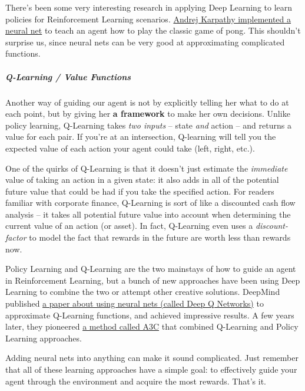 \documentclass[a4paper, 11pt]{article}
\begin{document}
There's been some very interesting research in applying Deep Learning to
learn policies for Reinforcement Learning scenarios.
\href{http://karpathy.github.io/2016/05/31/rl/}{Andrej Karpathy
implemented a neural net} to teach an agent how to play the classic game
of pong. This shouldn't surprise us, since neural nets can be very good
at approximating complicated functions.

\subparagraph{\emph{Q-Learning / Value Functions}}

Another way of guiding our agent is not by explicitly telling her what
to do at each point, but by giving her \textbf{a framework} to make her
own decisions. Unlike policy learning, Q-Learning takes \emph{two
inputs} -- state \emph{and} action -- and returns a value for each pair.
If you're at an intersection, Q-learning will tell you the expected
value of each action your agent could take (left, right, etc.).

One of the quirks of Q-Learning is that it doesn't just estimate the
\emph{immediate} value of taking an action in a given state: it also
adds in all of the potential future value that could be had if you take
the specified action. For readers familiar with corporate finance,
Q-Learning is sort of like a discounted cash flow analysis -- it takes
all potential future value into account when determining the current
value of an action (or asset). In fact, Q-Learning even uses a
\emph{discount-factor} to model the fact that rewards in the future are
worth less than rewards now.

Policy Learning and Q-Learning are the two mainstays of how to guide an
agent in Reinforcement Learning, but a bunch of new approaches have been
using Deep Learning to combine the two or attempt other creative
solutions. DeepMind published
\href{https://storage.googleapis.com/deepmind-media/dqn/DQNNaturePaper.pdf}{a
paper about using neural nets (called Deep Q Networks)} to approximate
Q-Learning functions, and achieved impressive results. A few years
later, they pioneered
\href{https://medium.com/emergent-future/simple-reinforcement-learning-with-tensorflow-part-8-asynchronous-actor-critic-agents-a3c-c88f72a5e9f2}{a
method called A3C} that combined Q-Learning and Policy Learning
approaches.

Adding neural nets into anything can make it sound complicated. Just
remember that all of these learning approaches have a simple goal: to
effectively guide your agent through the environment and acquire the
most rewards. That's it.
\end{document}
